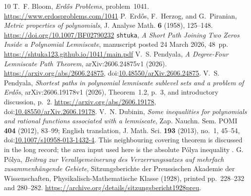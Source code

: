 \documentclass[11pt]{article}
\begin{document}
\begin{thebibliography}{10}
 T.~F. Bloom, \emph{Erd\H{o}s Problems}, problem~1041.
  \url{https://www.erdosproblems.com/1041}
 P.~Erd\H{o}s, F.~Herzog, and G.~Piranian,
  \emph{Metric properties of polynomials}, J. Analyse Math. \textbf{6}
  (1958), 125--148. \url{https://doi.org/10.1007/BF02790232}
 \texttt{shtuka},
  \emph{A Short Path Joining Two Zeros Inside a Polynomial Lemniscate},
  manuscript posted 24 March 2026, 48~pp.
  \url{https://shtuka123.github.io/1041/main.pdf}
 V.~S. Pendyala,
  \emph{A Degree-Four Lemniscate Path Theorem},
  arXiv:2606.24875v1 (2026).
  \url{https://arxiv.org/abs/2606.24875},
  doi:\href{https://doi.org/10.48550/arXiv.2606.24875}
  {10.48550/arXiv.2606.24875}.
 V.~S. Pendyala,
  \emph{Shortest paths in polynomial lemniscate sublevel sets and a problem
  of Erd\H{o}s}, arXiv:2606.19178v1 (2026),
  Theorem~1.2, p.~3, and introductory discussion, p.~2.
  \url{https://arxiv.org/abs/2606.19178},
  doi:\href{https://doi.org/10.48550/arXiv.2606.19178}
  {10.48550/arXiv.2606.19178}.
 V.~N. Dubinin, \emph{Some inequalities for polynomials and
  rational functions associated with a lemniscate}, Zap. Nauchn. Sem. POMI
  \textbf{404} (2012), 83--99; English translation, J. Math. Sci. \textbf{193}
  (2013), no.~1, 45--54,
  doi:\href{https://doi.org/10.1007/s10958-013-1432-4}{10.1007/s10958-013-1432-4}.
  This neighbouring covering theorem is discussed in the long record; the area input used here is the absolute P\'olya inequality \cite{polya1928}.
 G. P\'olya,
  \emph{Beitrag zur Verallgemeinerung des Verzerrungssatzes auf mehrfach
  zusammenh\"angende Gebiete}, Sitzungsberichte der Preussischen Akademie der
  Wissenschaften, Physikalisch-Mathematische Klasse (1928), printed
  pp.~228--232 and 280--282.
  \url{https://archive.org/details/sitzungsbericht1928preu}.
\end{thebibliography}
\end{document}
